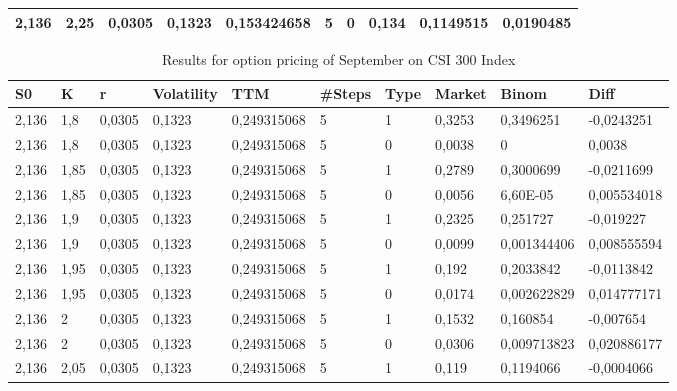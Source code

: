 \documentclass[11pt, titlepage]{article}
\begin{document}
{\begin{table}[ht]
\begin{tabular}{@{}llllllllll@{}}
2,136 & 2,25 & 0,0305 & 0,1323 & 0,153424658 & 5 & 0 & 0,134 & {\color[HTML]{3531FF} 0,1149515} & {\color[HTML]{F8A102} 0,0190485} \\ \bottomrule
\end{tabular}
\end{table}
\begin{table}[H]
\centering
\caption{Results for option pricing of September on CSI 300 Index}
\label{Option results September}
\begin{tabular}{@{}llllllllll@{}}
\toprule
\textbf{S0} & \textbf{K} & \textbf{r} & \textbf{Volatility} & \textbf{TTM} & \textbf{\#Steps} & \textbf{Type} & \textbf{Market} & \textbf{Binom} & \textbf{Diff} \\ \midrule
2,136 & 1,8 & 0,0305 & 0,1323 & 0,249315068 & 5 & 1 & 0,3253 & {\color[HTML]{3531FF} 0,3496251} & {\color[HTML]{F8A102} -0,0243251} \\
2,136 & 1,8 & 0,0305 & 0,1323 & 0,249315068 & 5 & 0 & 0,0038 & {\color[HTML]{3531FF} 0} & {\color[HTML]{F8A102} 0,0038} \\
2,136 & 1,85 & 0,0305 & 0,1323 & 0,249315068 & 5 & 1 & 0,2789 & {\color[HTML]{3531FF} 0,3000699} & {\color[HTML]{F8A102} -0,0211699} \\
2,136 & 1,85 & 0,0305 & 0,1323 & 0,249315068 & 5 & 0 & 0,0056 & {\color[HTML]{3531FF} 6,60E-05} & {\color[HTML]{F8A102} 0,005534018} \\
2,136 & 1,9 & 0,0305 & 0,1323 & 0,249315068 & 5 & 1 & 0,2325 & {\color[HTML]{3531FF} 0,251727} & {\color[HTML]{F8A102} -0,019227} \\
2,136 & 1,9 & 0,0305 & 0,1323 & 0,249315068 & 5 & 0 & 0,0099 & {\color[HTML]{3531FF} 0,001344406} & {\color[HTML]{F8A102} 0,008555594} \\
2,136 & 1,95 & 0,0305 & 0,1323 & 0,249315068 & 5 & 1 & 0,192 & {\color[HTML]{3531FF} 0,2033842} & {\color[HTML]{F8A102} -0,0113842} \\
2,136 & 1,95 & 0,0305 & 0,1323 & 0,249315068 & 5 & 0 & 0,0174 & {\color[HTML]{3531FF} 0,002622829} & {\color[HTML]{F8A102} 0,014777171} \\
2,136 & 2 & 0,0305 & 0,1323 & 0,249315068 & 5 & 1 & 0,1532 & {\color[HTML]{3531FF} 0,160854} & {\color[HTML]{F8A102} -0,007654} \\
2,136 & 2 & 0,0305 & 0,1323 & 0,249315068 & 5 & 0 & 0,0306 & {\color[HTML]{3531FF} 0,009713823} & {\color[HTML]{F8A102} 0,020886177} \\
2,136 & 2,05 & 0,0305 & 0,1323 & 0,249315068 & 5 & 1 & 0,119 & {\color[HTML]{3531FF} 0,1194066} & {\color[HTML]{F8A102} -0,0004066} \\

\end{tabular}
\end{table}}
\end{document}
